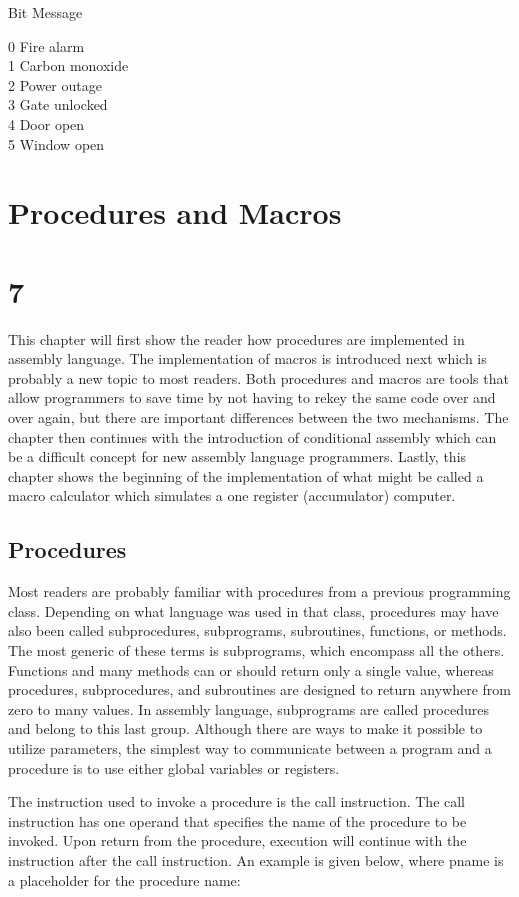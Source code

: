\documentclass[10pt]{article}
\begin{document}
Bit Message

0 Fire alarm\\
1 Carbon monoxide\\
2 Power outage\\
3 Gate unlocked\\
4 Door open\\
5 Window open

\section*{Procedures and Macros}
\section*{7}
This chapter will first show the reader how procedures are implemented in assembly language. The implementation of macros is introduced next which is probably a new topic to most readers. Both procedures and macros are tools that allow programmers to save time by not having to rekey the same code over and over again, but there are important differences between the two mechanisms. The chapter then continues with the introduction of conditional assembly which can be a difficult concept for new assembly language programmers. Lastly, this chapter shows the beginning of the implementation of what might be called a macro calculator which simulates a one register (accumulator) computer.

\subsection*{Procedures}
Most readers are probably familiar with procedures from a previous programming class. Depending on what language was used in that class, procedures may have also been called subprocedures, subprograms, subroutines, functions, or methods. The most generic of these terms is subprograms, which encompass all the others. Functions and many methods can or should return only a single value, whereas procedures, subprocedures, and subroutines are designed to return anywhere from zero to many values. In assembly language, subprograms are called procedures and belong to this last group. Although there are ways to make it possible to utilize parameters, the simplest way to communicate between a program and a procedure is to use either global variables or registers.

The instruction used to invoke a procedure is the call instruction. The call instruction has one operand that specifies the name of the procedure to be invoked. Upon return from the procedure, execution will continue with the instruction after the call instruction. An example is given below, where pname is a placeholder for the procedure name:
\end{document}
